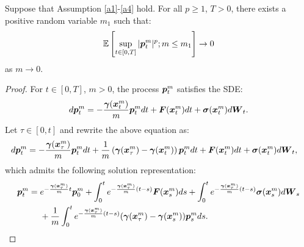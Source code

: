 \begin{proposition} Suppose that Assumption \ref{a1}-\ref{a4} hold. For all $p\geq 1$, $T > 0$, there exists a positive random variable $m_1$ such that: 
\begin{equation} \mathbb{E}\left[ \sup_{t \in [0,T]} |\boldsymbol{p}^m_{t}|^{p}; m \leq m_1 \right] \to 0 \end{equation}
as $m \to 0$.  
\end{proposition}
\begin{proof}
For $t \in [0,T]$, $m >0$,  the process $\boldsymbol{p}_t^m$ satisfies the SDE:
\begin{equation}
d\boldsymbol{p}_t^m = -\frac{\boldsymbol{\gamma}(\boldsymbol{x}_t^m)}{m} \boldsymbol{p}_t^m dt + \boldsymbol{F}(\boldsymbol{x}_t^m) dt + \boldsymbol{\sigma}(\boldsymbol{x}_t^m) d\boldsymbol{W}_t.
\end{equation} 
Let $\tau \in [0,t]$ and rewrite the above equation as:
\begin{align}
d\boldsymbol{p}_t^m &= -\frac{\boldsymbol{\gamma}(\boldsymbol{x}_\tau^m)}{m} \boldsymbol{p}_t^m dt + \frac{1}{m} \left( \boldsymbol{\gamma}(\boldsymbol{x}_{\tau}^m)  - \boldsymbol{\gamma}(\boldsymbol{x}_t^m) \right) \boldsymbol{p}_t^m  dt +  \boldsymbol{F}(\boldsymbol{x}_t^m) dt + \boldsymbol{\sigma}(\boldsymbol{x}_t^m) d\boldsymbol{W}_t,
\end{align} 
which admits the following solution representation:
\begin{align}
\boldsymbol{p}_t^m &= e^{-\frac{\boldsymbol{\gamma}(\boldsymbol{x}_\tau^m)}{m}t} \boldsymbol{p}_0^m + \int_0^t e^{-\frac{\boldsymbol{\gamma}(\boldsymbol{x}_\tau^m)}{m}(t-s)} \boldsymbol{F}(\boldsymbol{x}_s^m) ds + \int_0^t e^{-\frac{\boldsymbol{\gamma}(\boldsymbol{x}_\tau^m)}{m}(t-s)} \boldsymbol{\sigma}(\boldsymbol{x}_s^m) d\boldsymbol{W}_s \nonumber \\
&\ \ \ \  + \frac{1}{m} \int_0^t e^{-\frac{\boldsymbol{\gamma}(\boldsymbol{x}_\tau^m)}{m}(t-s)} (\boldsymbol{\gamma}(\boldsymbol{x}_\tau^m)-\boldsymbol{\gamma}(\boldsymbol{x}_s^m)) \boldsymbol{p}_s^m ds.    
\end{align}



\end{proof}
